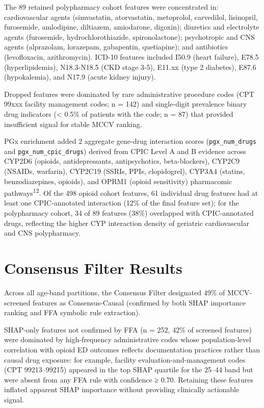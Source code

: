 \documentclass[
  12pt,
]{book}
\begin{document}
The 89 retained polypharmacy cohort features were concentrated in:
cardiovascular agents (simvastatin, atorvastatin, metoprolol,
carvedilol, lisinopril, furosemide, amlodipine, diltiazem, amiodarone,
digoxin); diuretics and electrolyte agents (furosemide,
hydrochlorothiazide, spironolactone); psychotropic and CNS agents
(alprazolam, lorazepam, gabapentin, quetiapine); and antibiotics
(levofloxacin, azithromycin). ICD-10 features included I50.9 (heart
failure), E78.5 (hyperlipidemia), N18.3-N18.5 (CKD stage 3-5), E11.xx
(type 2 diabetes), E87.6 (hypokalemia), and N17.9 (acute kidney injury).

Dropped features were dominated by rare administrative procedure codes
(CPT 99xxx facility management codes; n = 142) and single-digit
prevalence binary drug indicators (\textless{} 0.5\% of patients with
the code; n = 87) that provided insufficient signal for stable MCCV
ranking.

PGx enrichment added 2 aggregate gene-drug interaction scores
(\texttt{pgx\_num\_drugs} and \texttt{pgx\_num\_cpic\_drugs}) derived
from CPIC Level A and B evidence across CYP2D6 (opioids,
antidepressants, antipsychotics, beta-blockers), CYP2C9 (NSAIDs,
warfarin), CYP2C19 (SSRIs, PPIs, clopidogrel), CYP3A4 (statins,
benzodiazepines, opioids), and OPRM1 (opioid sensitivity) pharmacomic
pathways\textsuperscript{12}. Of the 498 opioid cohort features, 61
individual drug features had at least one CPIC-annotated interaction
(12\% of the final feature set); for the polypharmacy cohort, 34 of 89
features (38\%) overlapped with CPIC-annotated drugs, reflecting the
higher CYP interaction density of geriatric cardiovascular and CNS
polypharmacy.

\section{Consensus Filter Results}\label{consensus-filter-results}

Across all age-band partitions, the Consensus Filter designated 49\% of
MCCV-screened features as Consensus-Causal (confirmed by both SHAP
importance ranking and FFA symbolic rule extraction).

SHAP-only features not confirmed by FFA (n = 252, 42\% of screened
features) were dominated by high-frequency administrative codes whose
population-level correlation with opioid ED outcomes reflects
documentation practices rather than causal drug exposure: for example,
facility evaluation-and-management codes (CPT 99213--99215) appeared in
the top SHAP quartile for the 25--44 band but were absent from any FFA
rule with confidence ≥ 0.70. Retaining these features inflated apparent
SHAP importance without providing clinically actionable signal.
\end{document}
